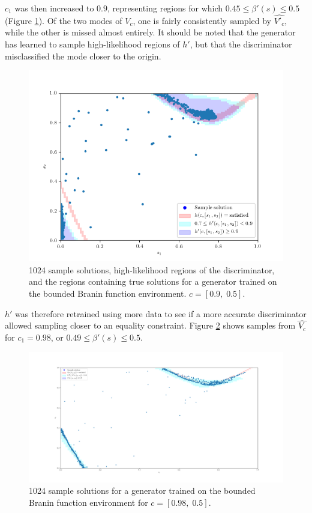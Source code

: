\documentclass[../../main.tex]{subfiles}
\begin{document}
$c_1$ was then increased to $0.9$, representing regions for which $0.45\le\beta'(s)\le0.5$ (Figure \ref{fig:equality09}).
Of the two modes of $V_c$, one is fairly consistently sampled by $\hat{V'_c}$, while the other is missed almost entirely.
It should be noted that the generator has learned to sample high-likelihood regions of $h'$, but that the discriminator misclassified the mode closer to the origin.
\begin{figure}[H]
    \begin{center}
    \includegraphics[width=\textwidth]{equality09}
    \caption{
        1024 sample solutions, high-likelihood regions of the discriminator, and the regions containing true solutions for a generator trained on the bounded Branin function environment.
        $c=[0.9,\;0.5]$.
    }
    \label{fig:equality09}
    \end{center}
\end{figure}
$h'$ was therefore retrained using more data to see if a more accurate discriminator allowed sampling closer to an equality constraint.
Figure \ref{fig:equality09805} shows samples from $\hat{V_c}$ for $c_1=0.98$, or $0.49\le\beta'(s)\le0.5$.
\begin{figure}
    \centering
    \includegraphics[width=\textwidth]{equality09805}
    \caption{
        1024 sample solutions for a generator trained on the bounded Branin function environment for $c=[0.98,\;0.5]$.
    }
    \label{fig:equality09805}
\end{figure}
\end{document}
